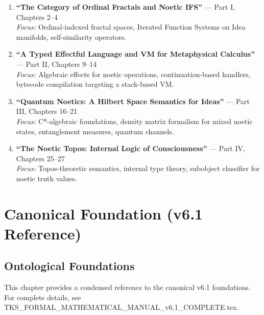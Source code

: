 \documentclass[11pt,twoside,openright]{book}
\theoremstyle{definition}
\theoremstyle{plain}
\theoremstyle{remark}
\begin{document}
\begin{enumerate}
  \item \textbf{``The Category of Ordinal Fractals and Noetic IFS''} --- Part I, Chapters 2--4\\
  \textit{Focus:} Ordinal-indexed fractal spaces, Iterated Function Systems on Idea manifolds, self-similarity operators.

  \item \textbf{``A Typed Effectful Language and VM for Metaphysical Calculus''} --- Part II, Chapters 9--14\\
  \textit{Focus:} Algebraic effects for noetic operations, continuation-based handlers, bytecode compilation targeting a stack-based VM.

  \item \textbf{``Quantum Noetics: A Hilbert Space Semantics for Ideas''} --- Part III, Chapters 16--21\\
  \textit{Focus:} C*-algebraic foundations, density matrix formalism for mixed noetic states, entanglement measures, quantum channels.

  \item \textbf{``The Noetic Topos: Internal Logic of Consciousness''} --- Part IV, Chapters 25--27\\
  \textit{Focus:} Topos-theoretic semantics, internal type theory, subobject classifier for noetic truth values.
\end{enumerate}

\mainmatter

\part{Canonical Foundation (v6.1 Reference)}

\chapter{Ontological Foundations}
\label{ch:foundations-reference}

\begin{tcolorbox}[colback=gray!10!white,colframe=gray!75!black,title=\textbf{Reference Chapter}]
This chapter provides a condensed reference to the canonical v6.1 foundations. For complete details, see TKS\_FORMAL\_MATHEMATICAL\_MANUAL\_v6.1\_COMPLETE.tex.
\end{tcolorbox}
\end{document}
